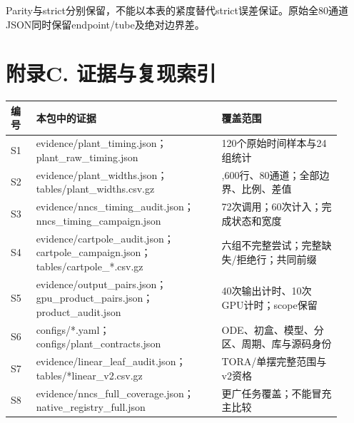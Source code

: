 \documentclass[UTF8,fontset=fandol,11pt,a4paper]{ctexart}
\begin{document}
\normalsize
Parity与strict分别保留，不能以本表的紧度替代strict误差保证。原始全80通道JSON同时保留endpoint/\allowbreak{}tube及绝对边界差。

\section*{附录C. 证据与复现索引}
\small
\par\noindent
{\setlength{\tabcolsep}{2pt}\renewcommand{\arraystretch}{1.25}
\begin{tabular}{>{\raggedright\arraybackslash}p{0.074\linewidth}>{\raggedright\arraybackslash}p{0.515\linewidth}>{\raggedright\arraybackslash}p{0.331\linewidth}}
\toprule
\textbf{编号} & \textbf{本包中的证据} & \textbf{覆盖范围} \\
\midrule
S1 & evidence/\allowbreak{}plant\_\allowbreak{}timing.json；plant\_\allowbreak{}raw\_\allowbreak{}timing.json & 120个原始时间样本与24组统计 \\
S2 & evidence/\allowbreak{}plant\_\allowbreak{}widths.json；tables/\allowbreak{}plant\_\allowbreak{}widths.csv.gz & 65,600行、80通道；全部边界、比例、差值 \\
S3 & evidence/\allowbreak{}nncs\_\allowbreak{}timing\_\allowbreak{}audit.json；nncs\_\allowbreak{}timing\_\allowbreak{}campaign.json & 72次调用；60次计入；完成状态和宽度 \\
S4 & evidence/\allowbreak{}cartpole\_\allowbreak{}audit.json；cartpole\_\allowbreak{}campaign.json；tables/\allowbreak{}cartpole\_\allowbreak{}*.csv.gz & 六组不完整尝试；完整缺失/\allowbreak{}拒绝行；共同前缀 \\
S5 & evidence/\allowbreak{}output\_\allowbreak{}pairs.json；gpu\_\allowbreak{}product\_\allowbreak{}pairs.json；product\_\allowbreak{}audit.json & 40次输出计时、10次GPU计时；scope保留 \\
S6 & configs/\allowbreak{}*.yaml；configs/\allowbreak{}plant\_\allowbreak{}contracts.json & ODE、初盒、模型、分区、周期、库与源码身份 \\
S7 & evidence/\allowbreak{}linear\_\allowbreak{}leaf\_\allowbreak{}audit.json；tables/\allowbreak{}*linear\_\allowbreak{}v2.csv.gz & TORA/\allowbreak{}单摆完整范围与v2资格 \\
S8 & evidence/\allowbreak{}nncs\_\allowbreak{}full\_\allowbreak{}coverage.json；native\_\allowbreak{}registry\_\allowbreak{}full.json & 更广任务覆盖；不能冒充主比较 \\
\bottomrule
\end{tabular}
}
\par
\end{document}
